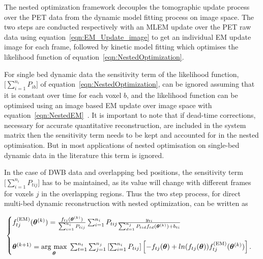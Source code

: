 The nested optimization framework decouples the tomographic update process over the PET data from the dynamic model fitting process on image space. The two steps are conducted respectively with an MLEM update over the PET raw data using equation~\ref{eqn:EM_Update_image} to get an individual EM update image for each frame, followed by kinetic model fitting which optimises the likelihood function of equation~\ref{eqn:NestedOptimization}. 

For single bed dynamic data the sensitivity term of the likelihood function, $\big[\sum_{i=1}^{n_i} P_{ib}\big]$ of equation~\ref{eqn:NestedOptimization}, can be ignored assuming that it is constant over time for each voxel $b$, and the likelihood function can be optimised using an image based EM update over image space with equation~\ref{eqn:NestedEM}~\cite{Wang2010,Reader2014}.
It is important to note that if dead-time corrections, necessary for accurate quantitative reconstruction, are included in the system matrix then the sensitivity term needs to be kept and accounted for in the nested optimisation. But in most applications of nested optimisation on single-bed dynamic data in the literature this term is ignored.

In the case of DWB data and overlapping bed positions, the sensitivity term $\big[\sum_{i=1}^{n_i} P_{tij}\big]$ has to be maintained, as its value will change with different frames for voxels $j$ in the overlapping regions.
Thus the two step process, for direct multi-bed dynamic reconstruction with nested optimization, can be written as

\begin{equation}
\label{eq3_3:NestedMultibed}
\text{}
\begin{cases}  
f_{tj}^{(\textrm{EM})}(\bm\theta^{(k)}) = \frac{f_{tj}(\bm\theta^{(k)})}{\sum_{i=1}^{n_i} P_{tij}} 
\sum_{i=1}^{n_i} P_{tij} 
\frac{y_{ti}}{\sum_{d=1}^{n_j} P_{tid} f_{td}(\bm\theta^{(k)}) + b_{ti} } \\ \\
\bm{\theta}^{(k+1)} = \underset{\bm{\theta}}{\operatorname{arg}\,\operatorname{max}}\; 
\sum_{t=1}^{n_t} \sum_{j=1}^{n_j} \left[ \sum_{i=1}^{n_i}  P_{tij} \right]
\left[ -f_{tj}(\bm\theta) + 
ln( f_{tj}(\bm\theta)) 
f_{tj}^{(\mathrm{EM})}(\bm{\theta}^{(k)})
\right] .\\
\end{cases}
\end{equation}

